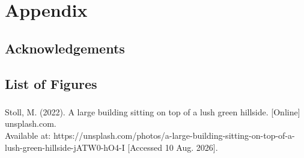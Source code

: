 \section{Appendix}

\subsection{Acknowledgements}


\subsection{List of Figures}

\subsubsection*{}

Stoll, M. (2022). A large building sitting on top of a lush green hillside. [Online] unsplash.com. \\ Available at: https://unsplash.com/photos/a-large-building-sitting-on-top-of-a-lush-green-hillside-jATW0-hO4-I [Accessed 10 Aug. 2026].